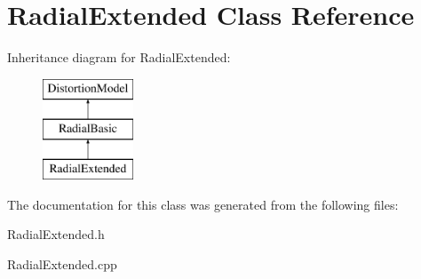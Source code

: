 \hypertarget{classRadialExtended}{
\section{RadialExtended Class Reference}
\label{classRadialExtended}
}
Inheritance diagram for RadialExtended:\begin{figure}[H]
\begin{center}
\leavevmode
\includegraphics[height=3.000000cm]{classRadialExtended}
\end{center}
\end{figure}


The documentation for this class was generated from the following files:\begin{DoxyCompactItemize}
\item 
RadialExtended.h\item 
RadialExtended.cpp\end{DoxyCompactItemize}
